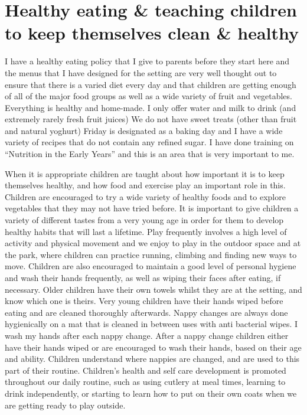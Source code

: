 \documentclass[10pt,a4paper]{report}
\makeatletter
\newcommand{\DESCRIPTION@original@item}{}
\let\DESCRIPTION@original@item\item
\newcommand*{\DESCRIPTION@envir}{DESCRIPTION}
\newlength{\DESCRIPTION@totalleftmargin}
\newlength{\DESCRIPTION@linewidth}
\newcommand{\DESCRIPTION@makelabel}[1]{\llap{#1}}%
\newcommand{\DESCRIPTION@item}[1][]{%
  \setlength{\@totalleftmargin}%
       {\DESCRIPTION@totalleftmargin+\widthof{\textbf{#1 }}-\leftmargin}%
  \setlength{\linewidth}
       {\DESCRIPTION@linewidth-\widthof{\textbf{#1 }}+\leftmargin}%
  \par\parshape \@ne \@totalleftmargin \linewidth
  \DESCRIPTION@original@item[\textbf{#1}]%
}
\newenvironment{DESCRIPTION}
  {\list{}{\setlength{\labelwidth}{0cm}%
           \let\makelabel\DESCRIPTION@makelabel}%
   \setlength{\DESCRIPTION@totalleftmargin}{\@totalleftmargin}%
   \setlength{\DESCRIPTION@linewidth}{\linewidth}%
   \renewcommand{\item}{\ifx\@currenvir\DESCRIPTION@envir
                           \expandafter\DESCRIPTION@item
                        \else
                           \expandafter\DESCRIPTION@original@item
                        \fi}}
  {\endlist}
\makeatother
\begin{document}
\begin{DESCRIPTION}
\section{Healthy eating \& teaching children to keep themselves clean \& healthy}

I have a healthy eating policy that I give to parents before they start here and the menus that I have designed for the setting are very well thought out to ensure that there is a varied diet every day and that children are getting enough of all of the major food groups as well as a wide variety of fruit and vegetables. Everything is healthy and home-made. I only offer water and milk to drink (and extremely rarely fresh fruit juices) We do not have sweet treats (other than fruit and natural yoghurt) Friday is designated as a baking day and I have a wide variety of recipes that do not contain any refined sugar. I have done training on “Nutrition in the Early Years” and this is an area that is very important to me. 

When it is appropriate children are taught about how important it is to keep themselves healthy, and how food and exercise play an important role in this. Children are encouraged to try a wide variety of healthy foods and to explore vegetables that they may not have tried before. It is important to give children a variety of different tastes from a very young age in order for them to develop healthy habits that will last a lifetime. Play frequently involves a high level of activity and physical movement and we enjoy to play in the outdoor space and at the park, where children can practice running, climbing and finding new ways to move. Children are also encouraged to maintain a good level of personal hygiene and wash their hands frequently, as well as wiping their faces after eating, if necessary. Older children have their own towels whilst they are at the setting, and know which one is theirs. Very young children have their hands wiped before eating and are cleaned thoroughly afterwards. Nappy changes are always done hygienically on a mat that is cleaned in between uses with anti bacterial wipes. I wash my hands after each nappy change. After a nappy change children either have their hands wiped or are encouraged to wash their hands, based on their age and ability. Children understand where nappies are changed, and are used to this part of their routine. Children's health and self care development is promoted throughout our daily routine, such as using cutlery at meal times, learning to drink independently, or starting to learn how to put on their own coats when we are getting ready to play outside.


\end{DESCRIPTION}
\end{document}
